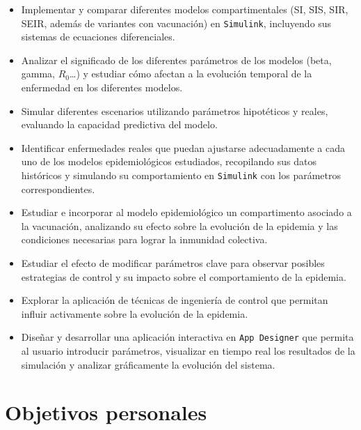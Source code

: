 \begin{itemize}
  \item Implementar y comparar diferentes modelos compartimentales (SI, SIS, SIR, SEIR, además de variantes con vacunación) en \texttt{Simulink}, incluyendo sus sistemas de ecuaciones diferenciales.
  \item Analizar el significado de los diferentes parámetros de los modelos (beta, gamma, \(R_0\)…) y estudiar cómo afectan a la evolución temporal de la enfermedad en los diferentes modelos.
  \item Simular diferentes escenarios utilizando parámetros hipotéticos y reales, evaluando la capacidad predictiva del modelo.
  \item Identificar enfermedades reales que puedan ajustarse adecuadamente a cada uno de los modelos epidemiológicos estudiados, recopilando sus datos históricos y simulando su comportamiento en \texttt{Simulink} con los parámetros correspondientes.
  \item Estudiar e incorporar al modelo epidemiológico un compartimento asociado a la vacunación, analizando su efecto sobre la evolución de la epidemia y las condiciones necesarias para lograr la inmunidad colectiva.
  \item Estudiar el efecto de modificar parámetros clave para observar posibles estrategias de control y su impacto sobre el comportamiento de la epidemia.
  \item Explorar la aplicación de técnicas de ingeniería de control que permitan influir activamente sobre la evolución de la epidemia.
  \item Diseñar y desarrollar una aplicación interactiva en \texttt{App Designer} que permita al usuario introducir parámetros, visualizar en tiempo real los resultados de la simulación y analizar gráficamente la evolución del sistema.
\end{itemize}

\section{Objetivos personales}

